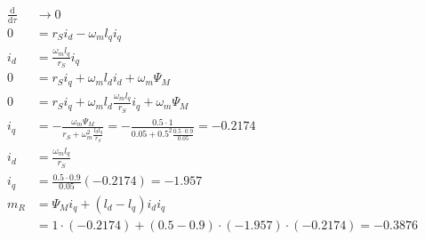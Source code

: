 \documentclass[11pt,a4paper]{scrartcl}
\newcommand{\mybr}[1]{\left(#1\right)}
\newcommand{\0}{_{\mybr{0}}}
\newcommand{\1}{_{\mybr{1}}}
\newcommand{\2}{_{\mybr{2}}}
\renewcommand{\d}{\mathrm{d}}
\begin{document}
\subsection{}
\begin{align}
\frac{\d}{\d\tau} &\rightarrow 0\\
0&=r_S i_d -\omega_m l_q i_q\\
i_d&=\frac{\omega_m l_q}{r_S} i_q\\
0&=r_S i_q+\omega_m l_d i_d + \omega_m\Psi_M \\
0&=r_S i_q+\omega_m l_d \frac{\omega_m l_q}{r_S} i_q + \omega_m\Psi_M \\
i_q&=-\frac{\omega_m \Psi_M}{r_S+\omega_m^2\frac{l_d l_q}{r_S}}=-\frac{\num{0.5}\cdot 1}{\num{0.05}+\num{0.5}^2\frac{\num{0.5}\cdot\num{0.9}}{\num{0.05}}}=\num{-0.2174}\\
i_d&=\frac{\omega_m l_q}{r_S}\\ i_q&=\frac{\num{0.5}\cdot\num{0.9}}{\num{0.05}}\mybr{\num{-0.2174}}=\num{-1.957}\\
m_R&=\Psi_M i_q+\mybr{l_d-l_q}i_d i_q\\
&=1\cdot\mybr{\num{-0.2174}}+\mybr{\num{0.5}-\num{0.9}}\cdot\mybr{\num{-1.957}}\cdot\mybr{{\num{-0.2174}}}=\num{-0.3876}
\end{align}






\end{document}
